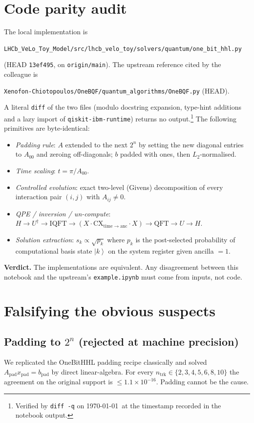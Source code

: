 \documentclass[a4paper,11pt]{article}
\providecommand{\ket}[1]{\left|#1\right\rangle}
\begin{document}
\section{Code parity audit}
The local implementation is
\begin{center}
\texttt{LHCb\_VeLo\_Toy\_Model/src/lhcb\_velo\_toy/solvers/quantum/one\_bit\_hhl.py}
\end{center}
(HEAD \texttt{13ef495}, on \texttt{origin/main}). The upstream reference cited by the
colleague is
\begin{center}
\texttt{Xenofon-Chiotopoulos/OneBQF/quantum\_algorithms/OneBQF.py} (HEAD).
\end{center}
A literal \texttt{diff} of the two files (modulo docstring expansion, type-hint additions
and a lazy import of \texttt{qiskit-ibm-runtime}) returns no output.\footnote{Verified by
\texttt{diff -q} on \today\ at the timestamp recorded in the notebook output.} The
following primitives are byte-identical:
\begin{itemize}
  \item \emph{Padding rule}: $A$ extended to the next $2^n$ by setting the new diagonal
    entries to $A_{00}$ and zeroing off-diagonals; $b$ padded with ones, then $L_2$-normalised.
  \item \emph{Time scaling}: $t = \pi / A_{00}$.
  \item \emph{Controlled evolution}: exact two-level (Givens) decomposition of every
    interaction pair $(i, j)$ with $A_{ij} \ne 0$.
  \item \emph{QPE / inversion / un-compute}: $H \to U^\dagger \to \text{IQFT} \to
    (X \cdot \text{CX}_{\mathrm{time}\to\mathrm{anc}} \cdot X) \to \text{QFT} \to U \to H$.
  \item \emph{Solution extraction}: $s_k \propto \sqrt{p_k}$ where $p_k$ is the
    post-selected probability of computational basis state $\ket{k}$ on the system register
    given ancilla $= 1$.
\end{itemize}

\textbf{Verdict.} The implementations are equivalent. Any disagreement between this
notebook and the upstream's \texttt{example.ipynb} must come from inputs, not code.

\section{Falsifying the obvious suspects}
\subsection{Padding to $2^n$ (rejected at machine precision)}
We replicated the OneBitHHL padding recipe classically and solved
$A_{\text{pad}} x_{\text{pad}} = b_{\text{pad}}$ by direct linear-algebra. For every
$n_\mathrm{trk} \in \{2,3,4,5,6,8,10\}$ the agreement on the original support is
$\le 1.1 \times 10^{-16}$. Padding cannot be the cause.
\end{document}
